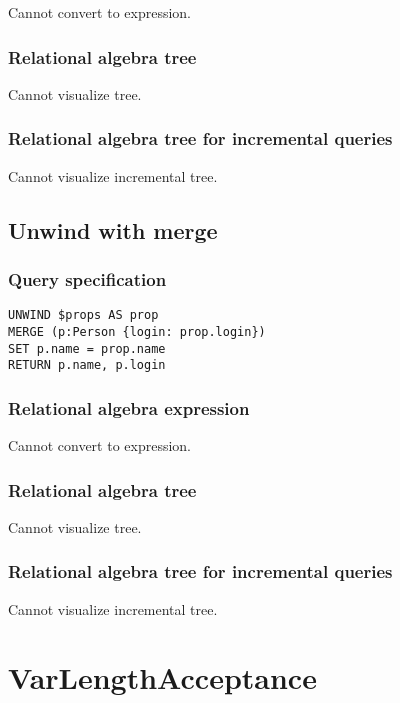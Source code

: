 Cannot convert to expression.

\subsubsection*{Relational algebra tree}

Cannot visualize tree.

\subsubsection*{Relational algebra tree for incremental queries}

Cannot visualize incremental tree.

\subsection{Unwind with merge}

\subsubsection*{Query specification}

\begin{lstlisting}
UNWIND $props AS prop
MERGE (p:Person {login: prop.login})
SET p.name = prop.name
RETURN p.name, p.login
\end{lstlisting}

\subsubsection*{Relational algebra expression}

Cannot convert to expression.

\subsubsection*{Relational algebra tree}

Cannot visualize tree.

\subsubsection*{Relational algebra tree for incremental queries}

Cannot visualize incremental tree.

\section{VarLengthAcceptance}


